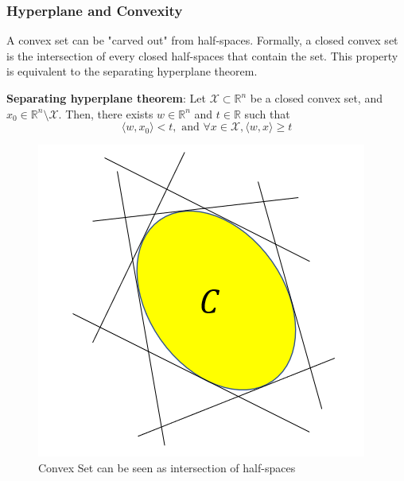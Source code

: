 \begin{frame}\frametitle{Hyperplane and Convexity}
    A convex set can be "carved out" from half-spaces. 
    Formally, a closed convex set is the intersection of every closed half-spaces that contain the set. This property is equivalent to the separating hyperplane theorem.\\
    \begin{theorem}
        \textbf{Separating hyperplane theorem}: Let $\mathcal{X} \subset \mathbb{R}^n$ be a closed convex set, and $x_0 \in \mathbb{R}^n \setminus \mathcal{X}$.
        Then, there exists $w \in \mathbb{R}^n$ and $t \in \mathbb{R}$ such that
        \begin{equation*}
            \langle w, x_0 \rangle < t, \text{ and } \forall x \in \mathcal{X}, \langle w, x \rangle \geq t
        \end{equation*}
    \end{theorem}

    \begin{figure}
    \includegraphics[scale=0.25]{./figures/carving_convex_set.png}
    \caption{Convex Set can be seen as intersection of half-spaces}
    \end{figure}
    
\end{frame}

